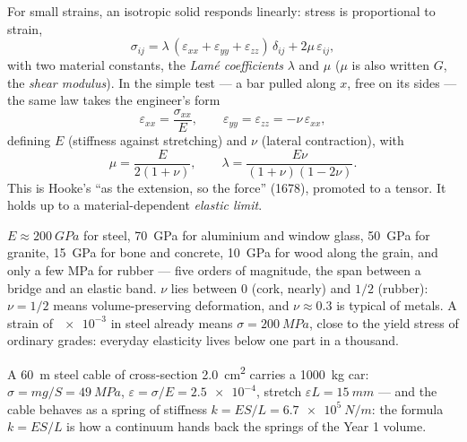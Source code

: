 \begin{theorem}\label{thm:b3:continuum-elasticity:hooke}
For small strains, an isotropic solid responds linearly: stress is
proportional to strain,
\[
\sigma_{ij} = \lambda\,(\varepsilon_{xx} + \varepsilon_{yy} +
\varepsilon_{zz})\,\delta_{ij} + 2\mu\,\varepsilon_{ij} ,
\]
with two material constants, the \emph{Lamé coefficients} $\lambda$ and
$\mu$ ($\mu$ is also written $G$, the \emph{shear modulus}). In the
simple  test --- a bar pulled along $x$, free on its sides ---
the same law takes the engineer's form
\[
\varepsilon_{xx} = \frac{\sigma_{xx}}{E} , \qquad
\varepsilon_{yy} = \varepsilon_{zz} = -\nu\,\varepsilon_{xx} ,
\]
defining \emph{} $E$ (stiffness against stretching) and
\emph{} $\nu$ (lateral contraction), with
\[
\mu = \frac{E}{2(1 + \nu)} , \qquad
\lambda = \frac{E\nu}{(1 + \nu)(1 - 2\nu)} .
\]
This is Hooke's ``as the extension, so the force'' (1678), promoted to
a tensor. It holds up to a material-dependent \emph{elastic limit}.
\end{theorem}
\admitted

\begin{remark}\label{rem:b3:continuum-elasticity:orders}
$E \approx \qty{200}{GPa}$ for steel, \qty{70}{GPa} for aluminium and
window glass, \qty{50}{GPa} for granite, \qty{15}{GPa} for bone and
concrete, \qty{10}{GPa} for wood along the grain, and only a few MPa
for rubber --- five orders of magnitude, the span between a bridge and
an elastic band. $\nu$ lies between $0$ (cork, nearly) and $1/2$
(rubber): $\nu = 1/2$ means volume-preserving deformation, and
$\nu \approx 0.3$ is typical of metals. A strain of $\num{e-3}$ in
steel already means $\sigma = \qty{200}{MPa}$, close to the yield
stress of ordinary grades: everyday elasticity lives below one part
in a thousand.
\end{remark}

\begin{example}\label{ex:b3:continuum-elasticity:cable}
A \qty{60}{m} steel cable of cross-section \qty{2.0}{cm^2} carries a
\qty{1000}{kg} car: $\sigma = mg/S = \qty{49}{MPa}$, $\varepsilon =
\sigma/E = \num{2.5e-4}$, stretch $\varepsilon L = \qty{15}{mm}$ ---
and the cable behaves as a spring of stiffness $k = ES/L =
\qty{6.7e5}{N/m}$: the formula $k = ES/L$ is how a continuum hands
back the springs of the Year 1 volume.
\end{example}

